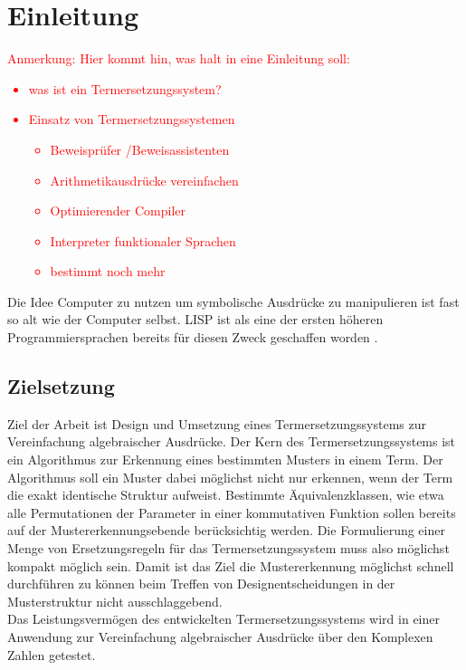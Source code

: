 

\section{Einleitung} \label{secEinleitung}
\textcolor{red} {
\begin{itshape}
Anmerkung: Hier kommt hin, was halt in eine Einleitung soll:
\begin{itemize}
    \item was ist ein Termersetzungssystem?
    \item Einsatz von Termersetzungssystemen
    \begin{itemize}
        \item Beweisprüfer /Beweisassistenten
        \item Arithmetikausdrücke vereinfachen
        \item Optimierender Compiler
        \item Interpreter funktionaler Sprachen
        \item bestimmt noch mehr
    \end{itemize}
\end{itemize}
\end{itshape}
}

Die Idee Computer zu nutzen um symbolische Ausdrücke zu manipulieren ist fast so alt wie der Computer selbst.  LISP ist als eine der ersten höheren Programmiersprachen bereits für diesen Zweck geschaffen worden \cite{lisp}. 

\subsection{Zielsetzung}
Ziel der Arbeit ist Design und Umsetzung eines Termersetzungssystems zur Vereinfachung algebraischer Ausdrücke. Der Kern des Termersetzungssystems ist ein Algorithmus zur Erkennung eines bestimmten Musters in einem Term. 
Der Algorithmus soll ein Muster dabei möglichst nicht nur erkennen, wenn der Term die exakt identische Struktur aufweist. Bestimmte Äquivalenzklassen, wie etwa alle Permutationen der Parameter in einer kommutativen Funktion sollen bereits auf der Mustererkennungsebende berücksichtig werden. Die Formulierung einer Menge von Ersetzungsregeln für das Termersetzungssystem muss also möglichst kompakt möglich sein. 
Damit ist das Ziel die Mustererkennung möglichst schnell durchführen zu können beim Treffen von Designentscheidungen in der Musterstruktur nicht ausschlaggebend. \\
Das Leistungsvermögen des entwickelten Termersetzungssystems wird in einer Anwendung zur Vereinfachung algebraischer Ausdrücke über den Komplexen Zahlen getestet. 

